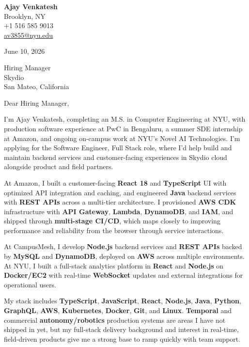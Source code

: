 \documentclass[letterpaper,11pt]{article}
\begin{document}
\begin{flushleft}
\textbf{\large Ajay Venkatesh} \\
Brooklyn, NY \\
+1 516 585 9013 \\
\href{mailto:av3855@nyu.edu}{av3855@nyu.edu}
\end{flushleft}
\vspace{10pt}
June 10, 2026
\vspace{6pt}

Hiring Manager \\
Skydio \\
San Mateo, California

\vspace{10pt}

Dear Hiring Manager,

I'm Ajay Venkatesh, completing an M.S. in Computer Engineering at NYU, with production software experience at PwC in Bengaluru, a summer SDE internship at Amazon, and ongoing on-campus work at NYU's Novel AI Technologies. I'm applying for the Software Engineer, Full Stack role, where I'd help build and maintain backend services and customer-facing experiences in Skydio cloud alongside product and field partners.

At Amazon, I built a customer-facing \textbf{React 18} and \textbf{TypeScript} UI with optimized API integration and caching, and engineered \textbf{Java} backend services with \textbf{REST APIs} across a multi-tier architecture. I provisioned \textbf{AWS CDK} infrastructure with \textbf{API Gateway}, \textbf{Lambda}, \textbf{DynamoDB}, and \textbf{IAM}, and shipped through \textbf{multi-stage CI/CD}, which maps closely to improving performance and reliability from the browser through service interactions.

At CampusMesh, I develop \textbf{Node.js} backend services and \textbf{REST APIs} backed by \textbf{MySQL} and \textbf{DynamoDB}, deployed on \textbf{AWS} across multiple environments. At NYU, I built a full-stack analytics platform in \textbf{React} and \textbf{Node.js} on \textbf{Docker/EC2} with real-time \textbf{WebSocket} updates and external integrations for operational users.

My stack includes \textbf{TypeScript}, \textbf{JavaScript}, \textbf{React}, \textbf{Node.js}, \textbf{Java}, \textbf{Python}, \textbf{GraphQL}, \textbf{AWS}, \textbf{Kubernetes}, \textbf{Docker}, \textbf{Git}, and \textbf{Linux}. \textbf{Temporal} and commercial \textbf{autonomy/robotics} production systems are areas I have not shipped in yet, but my full-stack delivery background and interest in real-time, field-driven products give me a strong base to ramp quickly with team support.
\end{document}
